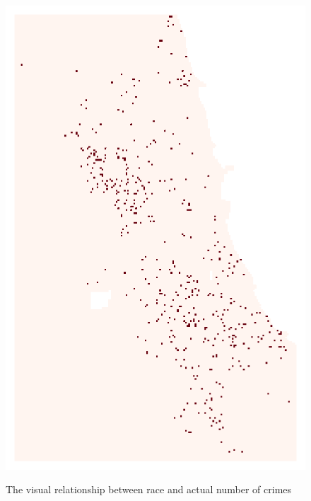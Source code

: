 \begin{figure}[bth]
{        \includegraphics[height=.45\textheight]{gfx/HeatmapActual.png}} \\
    \caption{The visual relationship between race and actual number of crimes}
    \label{fig:actual}
\end{figure}


